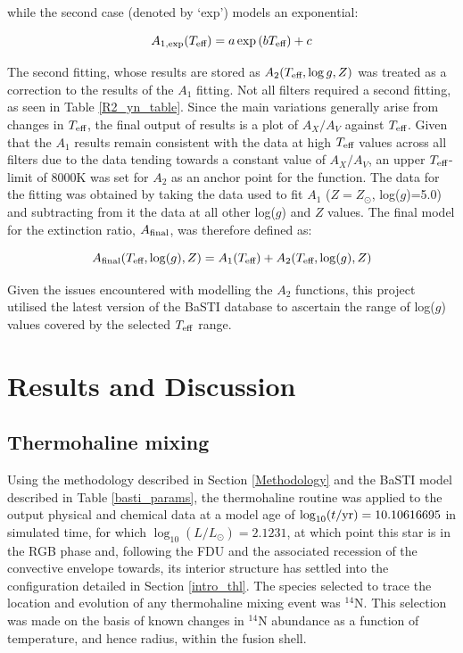 \documentclass[12pt, a4paper]{report}
\begin{document}
while the second case (denoted by `exp') models an exponential:

\begin{equation}
A_{1,\textnormal{exp}} (T_{\textnormal{eff}}) = a \exp{(b T_{\textnormal{eff}})} + c
\label{Teff_exp}
\end{equation}

The second fitting, whose results are stored as $A_{2}(T_{\textnormal{eff}},\log{g},Z)$ was treated as a correction to the results of the $A_{1}$ fitting. Not all filters required a second fitting, as seen in Table \ref{R2_yn_table}. Since the main variations generally arise from changes in $T_{\textnormal{eff}}$, the final output of results is a plot of $A_{X}/A_{V}$ against $T_{\textnormal{eff}}$. Given that the $A_{1}$ results remain consistent with the data at high $T_{\textnormal{eff}}$ values across all filters due to the data tending towards a constant value of $A_{X}/A_{V}$, an upper $T_{\textnormal{eff}}$-limit of 8000K was set for $A_{2}$ as an anchor point for the function. The data for the fitting was obtained by taking the data used to fit $A_{1}$ ($Z = Z_{\odot}$, log($g$)=5.0) and subtracting from it the data at all other log($g$) and $Z$ values. The final model for the extinction ratio, $A_{\textnormal{final}}$, was therefore defined as:

\begin{equation}
A_{\textnormal{final}}(T_{\textnormal{eff}},\log(g),Z) = A_{1}(T_{\textnormal{eff}}) + A_{2}(T_{\textnormal{eff}},\log(g),Z)
\label{Afinal}
\end{equation}

Given the issues encountered with modelling the $A_{2}$ functions, this project utilised the latest version of the BaSTI database \citep{2018ApJ...856..125H} to ascertain the range of log($g$) values covered by the selected $T_{\textnormal{eff}}$ range.

\chapter{Results and Discussion}
\section{Thermohaline mixing}
Using the methodology described in Section \ref{Methodology} and the BaSTI model described in Table \ref{basti_params}, the thermohaline routine was applied to the output physical and chemical data at a model age of $\log_{10}(t/\textnormal{yr}) = 10.10616695$ in simulated time, for which $\log_{10}(L/L_{\odot}) = 2.1231$, at which point this star is in the RGB phase and, following the FDU and the associated recession of the convective envelope towards, its interior structure has settled into the configuration detailed in Section \ref{intro_thl}. The species selected to trace the location and evolution of any thermohaline mixing event was $^{14}$N. This selection was made on the basis of known changes in $^{14}$N abundance as a function of temperature, and hence radius, within the fusion shell.
\end{document}
